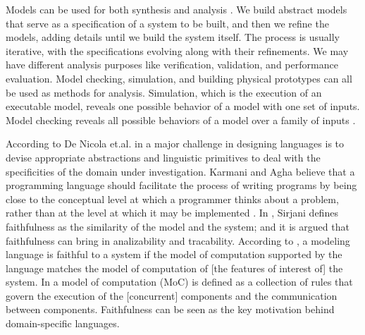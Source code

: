 Models can be used for both synthesis and analysis \cite{DBLP:conf/facs2/LeeS18}. We build abstract models that serve as a specification of a system to be built, and then we refine the models, adding
details until we build the system itself. The process is usually iterative, with
the specifications evolving along with their refinements. We may have different analysis purposes like verification, validation, and performance evaluation. 
Model checking, simulation, and building physical prototypes can all be used as methods for analysis. Simulation, which is the execution of an executable
model, reveals one possible behavior of a model with one set of inputs. Model
checking reveals all possible behaviors of a model over a family of inputs \cite{DBLP:conf/facs2/LeeS18}.



According to De Nicola et.al. in \cite{DBLP:conf/coordination/NicolaFPT18} a major challenge in designing languages is to devise appropriate abstractions and linguistic primitives to deal with the specificities of the domain under investigation.
%
Karmani and Agha believe that a programming language should facilitate the process of writing programs by being close to the conceptual level at which a programmer thinks about a problem, rather than at the level at which it may be implemented \cite{DBLP:reference/parallel/KarmaniA11}.
%
In \cite{DBLP:conf/birthday/FriendlinessSirjani18}, Sirjani defines faithfulness as the similarity of the
model and the system; and it is argued that faithfulness can bring in analizability and tracability. 
According to \cite{DBLP:conf/birthday/FriendlinessSirjani18}, a modeling
language is faithful to a system if the model of computation supported by the
language matches the model of computation of [the features of interest of] the
system. 
In \cite{Ptolemy:14:Book} a model of computation (MoC) is defined as a collection of rules that govern
the execution of the [concurrent] components and the communication between
components.
Faithfulness can be seen as the key motivation behind domain-specific
languages.

